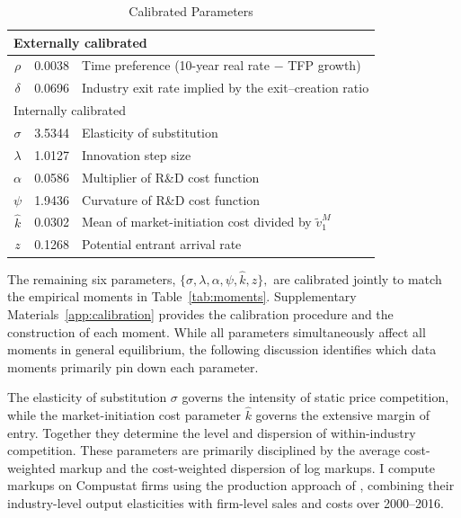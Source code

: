\documentclass[12pt]{article}
\begin{document}
\begin{table}[t!]
\caption{Calibrated Parameters}\label{tab:calibration}
\centering
\begin{tabular}{c|c|l} \hline\hline
\multicolumn{3}{l}{Externally calibrated}                               \\ \hline
\(\rho\)    & 0.0038 & Time preference (10-year real rate \(-\) TFP growth)                \\
\(\delta\)  & 0.0696 & Industry exit rate implied by the exit--creation ratio      \\ \hline\hline
\multicolumn{3}{l}{Internally calibrated}                               \\ \hline
\(\sigma\)  & 3.5344 & Elasticity of substitution                                      \\
\(\lambda\) & 1.0127 & Innovation step size                                            \\
\(\alpha\)  & 0.0586 & Multiplier of R\&D cost function                                \\
\(\psi\)    & 1.9436 & Curvature of R\&D cost function                                 \\
\(\hat{k}\) & 0.0302 & Mean of market-initiation cost divided by \(\tilde{v}^M_1\)       \\
\(z\)       & 0.1268 & Potential entrant arrival rate                                  \\ \hline\hline
\end{tabular}
\end{table}

The remaining six parameters, \(\{\sigma, \lambda, \alpha, \psi, \hat{k}, z\},\) are calibrated jointly to match the empirical moments in Table~\ref{tab:moments}. Supplementary Materials~\ref{app:calibration} provides the calibration procedure and the construction of each moment. While all parameters simultaneously affect all moments in general equilibrium, the following discussion identifies which data moments primarily pin down each parameter.

The elasticity of substitution \(\sigma\) governs the intensity of static price competition, while the market-initiation cost parameter \(\hat{k}\) governs the extensive margin of entry. Together they determine the level and dispersion of within-industry competition. These parameters are primarily disciplined by the average cost-weighted markup and the cost-weighted dispersion of log markups. I compute markups on Compustat firms using the production approach of \citet{DeLoeckerEU20}, combining their industry-level output elasticities with firm-level sales and costs over 2000--2016.
\end{document}
